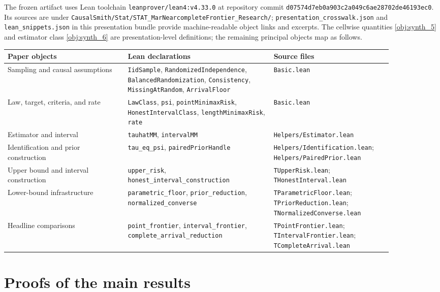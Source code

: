 \documentclass[11pt]{article}
\begin{document}
The frozen artifact uses Lean toolchain \texttt{leanprover/lean4:v4.33.0} at repository commit \texttt{d07574d7eb0a903c2a049c6ae28702de46193ec0}. Its sources are under \texttt{CausalSmith/Stat/STAT\_MarNearcompleteFrontier\_Research/}; \texttt{presentation\_crosswalk.json} and \texttt{lean\_snippets.json} in this presentation bundle provide machine-readable object links and excerpts. The cellwise quantities \cref{obj:synth_5} and estimator class \cref{obj:synth_6} are presentation-level definitions; the remaining principal objects map as follows.

\begin{center}
\small
\begin{tabular}{p{0.29\linewidth}p{0.34\linewidth}p{0.25\linewidth}}
\toprule
Paper objects & Lean declarations & Source files \\
\midrule
Sampling and causal assumptions & \texttt{IidSample}, \texttt{RandomizedIndependence}, \texttt{BalancedRandomization}, \texttt{Consistency}, \texttt{MissingAtRandom}, \texttt{ArrivalFloor} & \texttt{Basic.lean} \\
Law, target, criteria, and rate & \texttt{LawClass}, \texttt{psi}, \texttt{pointMinimaxRisk}, \texttt{HonestIntervalClass}, \texttt{lengthMinimaxRisk}, \texttt{rate} & \texttt{Basic.lean} \\
Estimator and interval & \texttt{tauhatMM}, \texttt{intervalMM} & \texttt{Helpers/Estimator.lean} \\
Identification and prior construction & \texttt{tau\_eq\_psi}, \texttt{pairedPriorHandle} & \texttt{Helpers/Identification.lean}; \texttt{Helpers/PairedPrior.lean} \\
Upper bound and interval construction & \texttt{upper\_risk}, \texttt{honest\_interval\_construction} & \texttt{TUpperRisk.lean}; \texttt{THonestInterval.lean} \\
Lower-bound infrastructure & \texttt{parametric\_floor}, \texttt{prior\_reduction}, \texttt{normalized\_converse} & \texttt{TParametricFloor.lean}; \texttt{TPriorReduction.lean}; \texttt{TNormalizedConverse.lean} \\
Headline comparisons & \texttt{point\_frontier}, \texttt{interval\_frontier}, \texttt{complete\_arrival\_reduction} & \texttt{TPointFrontier.lean}; \texttt{TIntervalFrontier.lean}; \texttt{TCompleteArrival.lean} \\
\bottomrule
\end{tabular}
\end{center}


\section{Proofs of the main results}\label{sec:deferred-proofs}
\end{document}
